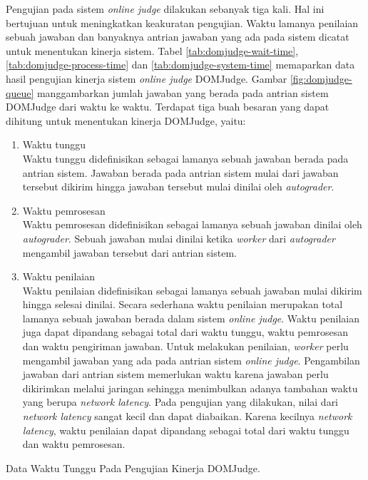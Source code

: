 \par Pengujian pada sistem \textit{online judge} dilakukan sebanyak tiga kali. Hal ini bertujuan untuk meningkatkan keakuratan pengujian. Waktu lamanya penilaian sebuah jawaban dan banyaknya antrian jawaban yang ada pada sistem dicatat untuk menentukan kinerja sistem. Tabel \ref{tab:domjudge-wait-time}, \ref{tab:domjudge-process-time} dan \ref{tab:domjudge-system-time} memaparkan data hasil pengujian kinerja sistem \textit{online judge} DOMJudge. Gambar \ref{fig:domjudge-queue} manggambarkan jumlah jawaban yang berada pada antrian sistem DOMJudge dari waktu ke waktu. Terdapat tiga buah besaran yang dapat dihitung untuk menentukan kinerja DOMJudge, yaitu:
\begin{enumerate}
  \item Waktu tunggu \\ Waktu tunggu didefinisikan sebagai lamanya sebuah jawaban berada pada antrian sistem. Jawaban berada pada antrian sistem mulai dari jawaban tersebut dikirim hingga jawaban tersebut mulai dinilai oleh \textit{autograder}.
  \item Waktu pemrosesan \\ Waktu pemrosesan didefinisikan sebagai lamanya sebuah jawaban dinilai oleh \textit{autograder}. Sebuah jawaban mulai dinilai ketika \textit{worker} dari \textit{autograder} mengambil jawaban tersebut dari antrian sistem.
  \item Waktu penilaian \\ Waktu penilaian didefinisikan sebagai lamanya sebuah jawaban mulai dikirim hingga selesai dinilai. Secara sederhana waktu penilaian merupakan total lamanya sebuah jawaban berada dalam sistem \textit{online judge}. Waktu penilaian juga dapat dipandang sebagai total dari waktu tunggu, waktu pemrosesan dan waktu pengiriman jawaban. Untuk melakukan penilaian, \textit{worker} perlu mengambil jawaban yang ada pada antrian sistem \textit{online judge}. Pengambilan jawaban dari antrian sistem memerlukan waktu karena jawaban perlu dikirimkan melalui jaringan sehingga menimbulkan adanya tambahan waktu yang berupa \textit{network latency}. Pada pengujian yang dilakukan, nilai dari \textit{network latency} sangat kecil dan dapat diabaikan. Karena kecilnya \textit{network latency}, waktu penilaian dapat dipandang sebagai total dari waktu tunggu dan waktu pemrosesan.
\end{enumerate}

\begin{table}[ht]
    \centering
    
    \caption{Data Waktu Tunggu Pada Pengujian Kinerja DOMJudge.}
    \label{tab:domjudge-wait-time}
\end{table}

